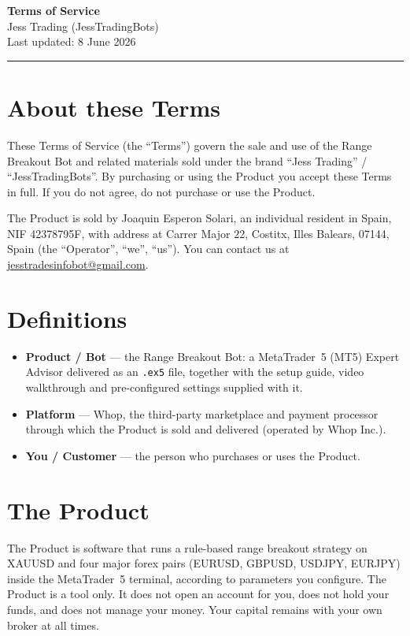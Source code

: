 \documentclass[11pt,a4paper]{article}
\begin{document}
\thispagestyle{fancy}

{\Huge\bfseries Terms of Service}\\[0.4em]
{\large Jess Trading (JessTradingBots)}\\[0.3em]
{\small Last updated: 8 June 2026}

\vspace{0.6em}
\hrule
\vspace{1em}

\section{About these Terms}
These Terms of Service (the ``Terms'') govern the sale and use of the Range Breakout Bot and related
materials sold under the brand ``Jess Trading'' / ``JessTradingBots''. By purchasing or using the
Product you accept these Terms in full. If you do not agree, do not purchase or use the Product.

The Product is sold by Joaquin Esperon Solari, an individual resident in Spain, NIF 42378795F, with
address at Carrer Major 22, Costitx, Illes Balears, 07144, Spain (the ``Operator'', ``we'', ``us'').
You can contact us at \href{mailto:jesstradesinfobot@gmail.com}{jesstradesinfobot@gmail.com}.

\section{Definitions}
\begin{itemize}
  \item \textbf{Product / Bot} --- the Range Breakout Bot: a MetaTrader~5 (MT5) Expert Advisor
  delivered as an \texttt{.ex5} file, together with the setup guide, video walkthrough and
  pre-configured settings supplied with it.
  \item \textbf{Platform} --- Whop, the third-party marketplace and payment processor through which
  the Product is sold and delivered (operated by Whop Inc.).
  \item \textbf{You / Customer} --- the person who purchases or uses the Product.
\end{itemize}

\section{The Product}
The Product is software that runs a rule-based range breakout strategy on XAUUSD and four major
forex pairs (EURUSD, GBPUSD, USDJPY, EURJPY) inside the MetaTrader~5 terminal, according to
parameters you configure. The Product is a tool only. It does not open an account for you, does not
hold your funds, and does not manage your money. Your capital remains with your own broker at all
times.
\end{document}
